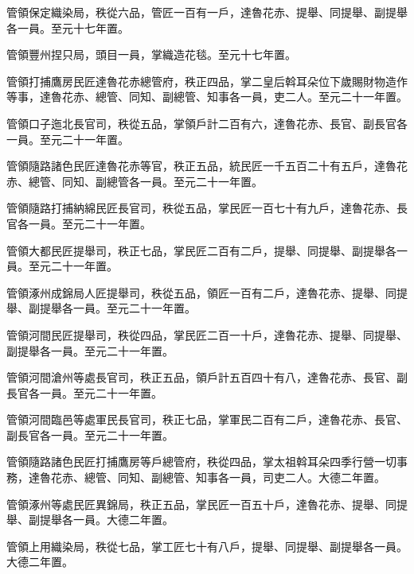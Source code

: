 \begin{pinyinscope}
 管領保定織染局，秩從六品，管匠一百有一戶，達魯花赤、提舉、同提舉、副提舉各一員。至元十七年置。



 管領豐州捏只局，頭目一員，掌織造花毯。至元十七年置。



 管領打捕鷹房民匠達魯花赤總管府，秩正四品，掌二皇后斡耳朵位下歲賜財物造作等事，達魯花赤、總管、同知、副總管、知事各一員，吏二人。至元二十一年置。



 管領口子迤北長官司，秩從五品，掌領戶計二百有六，達魯花赤、長官、副長官各一員。至元二十一年置。



 管領隨路諸色民匠達魯花赤等官，秩正五品，統民匠一千五百二十有五戶，達魯花赤、總管、同知、副總管各一員。至元二十一年置。



 管領隨路打捕納綿民匠長官司，秩從五品，掌民匠一百七十有九戶，達魯花赤、長官各一員。至元二十一年置。



 管領大都民匠提舉司，秩正七品，掌民匠二百有二戶，提舉、同提舉、副提舉各一員。至元二十一年置。



 管領涿州成錦局人匠提舉司，秩從五品，領匠一百有二戶，達魯花赤、提舉、同提舉、副提舉各一員。至元二十一年置。



 管領河間民匠提舉司，秩從四品，掌民匠二百一十戶，達魯花赤、提舉、同提舉、副提舉各一員。至元二十一年置。



 管領河間滄州等處長官司，秩正五品，領戶計五百四十有八，達魯花赤、長官、副長官各一員。至元二十一年置。



 管領河間臨邑等處軍民長官司，秩正七品，掌軍民二百有二戶，達魯花赤、長官、副長官各一員。至元二十一年置。



 管領隨路諸色民匠打捕鷹房等戶總管府，秩從四品，掌太祖斡耳朵四季行營一切事務，達魯花赤、總管、同知、副總管、知事各一員，司吏二人。大德二年置。



 管領涿州等處民匠異錦局，秩正五品，掌民匠一百五十戶，達魯花赤、提舉、同提舉、副提舉各一員。大德二年置。



 管領上用織染局，秩從七品，掌工匠七十有八戶，提舉、同提舉、副提舉各一員。大德二年置。




\end{pinyinscope}

